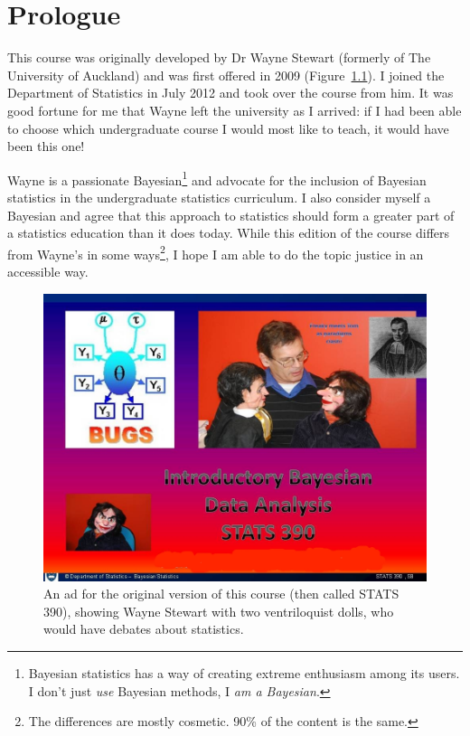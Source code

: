 \chapter{Prologue}
This course was originally developed by Dr Wayne Stewart (formerly of The
University of
Auckland) and was first offered in 2009 (Figure~\ref{fig:wayne}).
I joined the Department of Statistics in July 2012
and took over the course from him. It was good fortune for me that Wayne left
the university as I arrived: if I had been able to choose which undergraduate
course I would most like to teach, it would have been this one!

Wayne is a passionate Bayesian\footnote{Bayesian statistics has a way of
creating extreme enthusiasm among its users. I don't just {\it use} Bayesian
methods, I {\it am a Bayesian}.}
and advocate
for the inclusion of Bayesian statistics in the undergraduate
statistics curriculum. I also consider myself a Bayesian and agree that this
approach to statistics should form a greater part of a statistics education
than it does today. 
While this edition of the course differs from Wayne's in some ways\footnote{
The differences are mostly cosmetic. 90\% of the content is the same.},
I hope I am able to do the topic justice in an accessible way.

\begin{figure}
\begin{center}
\includegraphics[scale=0.5]{Figures/390course.jpg}
\end{center}
\caption{An ad for the original version of this course (then called
STATS 390), showing Wayne Stewart with two ventriloquist dolls, who would
have debates about statistics.\label{fig:wayne}}
\end{figure}

